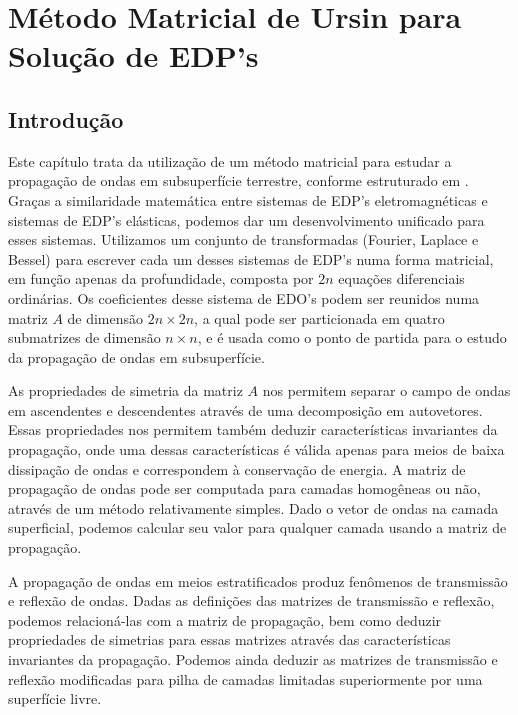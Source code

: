 \chapter{M\'etodo Matricial de Ursin para Solu\c{c}\~ao de EDP's}

\section{Introdu\c{c}\~ao}
Este cap\'itulo trata da utiliza\c{c}\~ao de um m\'etodo matricial para estudar a propaga\c{c}\~ao de ondas em subsuperf\'icie terrestre, conforme estruturado em \cite{Ursin-1983}. Gra\c{c}as a similaridade matem\'atica entre sistemas de EDP's eletromagn\'eticas e sistemas de EDP's el\'asticas, podemos dar um desenvolvimento unificado para esses sistemas. Utilizamos um conjunto de transformadas (Fourier, Laplace e Bessel) para escrever cada um desses sistemas de EDP's numa forma matricial, em fun\c{c}\~ao apenas da profundidade, composta por $2n$ equa\c{c}\~oes diferenciais ordin\'arias. Os coeficientes desse sistema de EDO's podem ser reunidos numa matriz $A$ de dimens\~ao $2n\times 2n$, a qual pode ser particionada em quatro submatrizes de dimens\~ao $n\times n$, e \'e usada como o ponto de partida para o estudo da propaga\c{c}\~ao de ondas em subsuperf\'icie.  

As propriedades de simetria da matriz $A$ nos permitem separar o campo de ondas em ascendentes e descendentes atrav\'es de uma decomposi\c{c}\~ao em autovetores. Essas propriedades nos permitem tamb\'em deduzir caracter\'isticas invariantes da propaga\c{c}\~ao, onde uma dessas caracter\'isticas \'e v\'alida apenas para meios de baixa dissipa\c{c}\~ao de ondas e correspondem \`a conserva\c{c}\~ao de energia. A matriz de propaga\c{c}\~ao de ondas pode ser computada para camadas homog\^eneas ou n\~ao, atrav\'es de um m\'etodo relativamente simples. Dado o vetor de ondas na camada superficial, podemos calcular seu valor para qualquer camada usando a matriz de propaga\c{c}\~ao.

A propaga\c{c}\~ao de ondas em meios estratificados produz fen\^omenos de transmiss\~ao e reflex\~ao de ondas. Dadas as defini\c{c}\~oes das matrizes de transmiss\~ao e reflex\~ao, podemos relacion\'a-las com a matriz de propaga\c{c}\~ao, bem como deduzir propriedades de simetrias para essas matrizes atrav\'es das caracter\'isticas invariantes da propaga\c{c}\~ao. Podemos ainda deduzir as matrizes de transmiss\~ao e reflex\~ao modificadas para pilha de camadas limitadas superiormente por uma superf\'icie livre.

